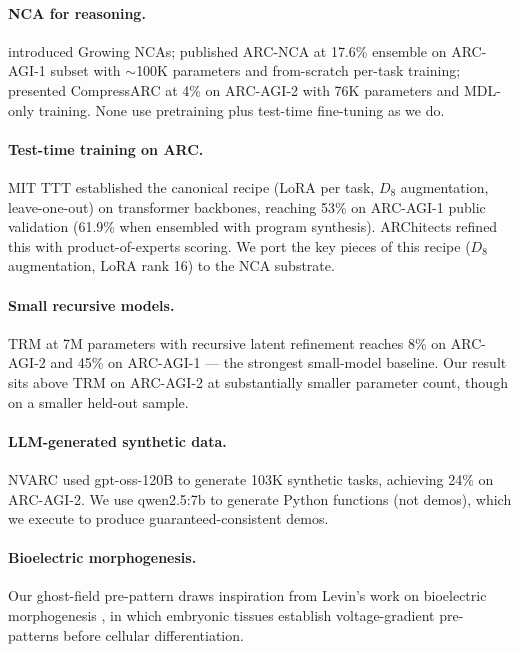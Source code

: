 \documentclass[11pt]{article}
\begin{document}
\paragraph{NCA for reasoning.} \citet{mordvintsev2020growing} introduced Growing NCAs; \citet{guichard2025arcnca} published ARC-NCA at 17.6\% ensemble on ARC-AGI-1 subset with $\sim$100K parameters and from-scratch per-task training; \citet{liao2025compressarc} presented CompressARC at 4\% on ARC-AGI-2 with 76K parameters and MDL-only training. None use pretraining plus test-time fine-tuning as we do.

\paragraph{Test-time training on ARC.} MIT TTT \citep{akyurek2024ttt} established the canonical recipe (LoRA per task, $D_8$ augmentation, leave-one-out) on transformer backbones, reaching 53\% on ARC-AGI-1 public validation (61.9\% when ensembled with program synthesis). ARChitects \citep{architects2025} refined this with product-of-experts scoring. We port the key pieces of this recipe ($D_8$ augmentation, LoRA rank 16) to the NCA substrate.

\paragraph{Small recursive models.} TRM \citep{jolicoeur2025trm} at 7M parameters with recursive latent refinement reaches 8\% on ARC-AGI-2 and 45\% on ARC-AGI-1 --- the strongest small-model baseline. Our result sits above TRM on ARC-AGI-2 at substantially smaller parameter count, though on a smaller held-out sample.

\paragraph{LLM-generated synthetic data.} NVARC \citep{sorokin2025nvarc} used gpt-oss-120B to generate 103K synthetic tasks, achieving 24\% on ARC-AGI-2. We use qwen2.5:7b to generate Python functions (not demos), which we execute to produce guaranteed-consistent demos.

\paragraph{Bioelectric morphogenesis.} Our ghost-field pre-pattern draws inspiration from Levin's work on bioelectric morphogenesis \citep{levin2014molecular,levin2021bioelectric}, in which embryonic tissues establish voltage-gradient pre-patterns before cellular differentiation.
\end{document}
